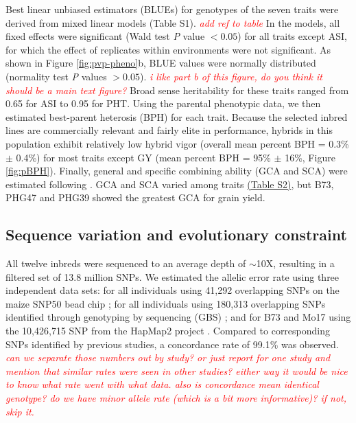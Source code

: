 \documentclass[9pt,twocolumn,twoside]{gsajnl}
\newcommand{\jri}[1]{\textcolor{red}{ \emph{ #1}} }
\begin{document}
Best linear unbiased estimators (BLUEs) for genotypes of the seven traits were derived from mixed linear models (Table S1). \jri{add ref to table}
In the models, all fixed effects were significant (Wald test \emph{P} value $<0.05$) for all traits except ASI, for which the effect of replicates within environments were not significant. 
As shown in Figure \ref{fig:pvp-pheno}b, BLUE values were normally distributed (normality test \emph{P} values $>0.05$). \jri{i like part b of this figure, do you think it should be a main text figure?}
Broad sense heritability for these traits ranged from 0.65 for ASI to 0.95 for PHT. 
Using the parental phenotypic data, we then estimated best-parent heterosis (BPH) for each trait.  
Because the selected inbred lines are commercially relevant and fairly elite in performance, hybrids in this population exhibit relatively low hybrid vigor (overall mean percent BPH = 0.3\% $\pm$ 0.4\%) for most traits except GY (mean percent BPH = 95\% $\pm$ 16\%, Figure \ref{fig:pBPH}). 
Finally, general and specific combining ability (GCA and SCA) were estimated following \citep{Falconer1996}. 
GCA and SCA varied among traits \href{run:https://github.com/RILAB/pvpDiallel/tree/master/manuscript/SI/Table_S2.CA.csv}{(Table S2)}, but B73, PHG47 and PHG39 showed the greatest GCA for grain yield.

\subsection*{Sequence variation and evolutionary constraint}

All twelve inbreds were sequenced to an average depth of $\sim$10X, resulting in a filtered set of 13.8 million SNPs. 
We estimated the allelic error rate using three independent data sets: for all individuals using 41,292 overlapping SNPs on the maize SNP50 bead chip \citep{Heerwaarden2012}; for all individuals using 180,313 overlapping SNPs identified through genotyping by sequencing (GBS) \citep{Romay2013}; and for B73 and Mo17 using the 10,426,715 SNP from the HapMap2 project \citep{Chia2012}.  Compared to corresponding SNPs identified by previous studies, a concordance rate of 99.1\% was observed. \jri{can we separate those numbers out by study? or just report for one study and mention that similar rates were seen in other studies? either way it would be nice to know what rate went with what data. also is concordance mean identical genotype? do we have minor allele rate (which is a bit more informative)? if not, skip it.}
\end{document}
